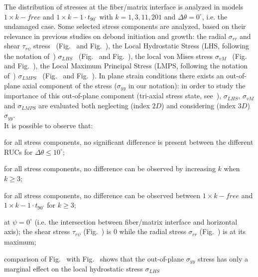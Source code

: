 \documentclass[12pt,a4paper]{article}
\begin{document}
The distribution of stresses at the fiber/matrix interface is analyzed in models $1\times k-free$ and $1\times k-1\cdot t_{90^{\circ}}$ with $k=1,3,11,201$ and $\Delta\theta=0^{\circ}$, i.e. the undamaged case. Some selected stress components are analyzed, based on their relevance in previous studies on debond initiation and growth: the radial $\sigma_{rr}$ and shear $\tau_{r\psi}$ stress~\cite{Mantic2009} (Fig.~\cite{fig:stress-a} and Fig.~\cite{fig:stress-b}), the Local Hydrostatic Stress (LHS, following the notation of~\cite{Carraro2016}) $\sigma_{LHS}$~\cite{Asp1996a,Asp1996b} (Fig.~\cite{fig:stress-c} and Fig.~\cite{fig:stress-d}), the local von Mises stress $\sigma_{vM}$~\cite{Canal2012}  (Fig.~\cite{fig:stress-e} and Fig.~\cite{fig:stress-f}), the Local Maximum Principal Stress (LMPS, following the notation of~\cite{Carraro2016}) $\sigma_{LMPS}$~\cite{Carraro2014}  (Fig.~\cite{fig:stress-g} and Fig.~\cite{fig:stress-h}). In plane strain conditions there exists an out-of-plane axial component of the stress ($\sigma_{yy}$ in our notation): in order to study the importance of this out-of-plane component (tri-axial stress state, see~\cite{Asp1995}), $\sigma_{LHS}$, $\sigma_{vM}$ and $\sigma_{LMPS}$ are evaluated both neglecting (index $2D$) and considering (index $3D$)  $\sigma_{yy}$.\\
It is possible to observe that:

\begin{itemize}[\label={--}]
\item for all stress components, no significant difference is present between the different RUCs for $\Delta\theta\leq10^{\circ}$;
\item for all stress components, no difference can be observed by increasing $k$ when $k\geq3$;
\item for all stress components, no difference can be observed between $1\times  k-free$ and $1\times  k-1\cdot t_{90^{\circ}}$ for $k\geq3$;
\item at $\psi=0^{\circ}$ (i.e. the intersection between fiber/matrix interface and horizontal axis); the shear stress $\tau_{r\psi}$ (Fig.~\cite{fig:stress-b}) is $0$ while the radial stress $\sigma_{rr}$ (Fig.~\cite{fig:stress-a}) is at its maximum;
\item comparison of Fig.~\cite{fig:stress-c} with Fig.~\cite{fig:stress-d} shows that the out-of-plane $\sigma_{yy}$ stress has only a marginal effect on the local hydrostatic stress $\sigma_{LHS}$
\end{itemize}
\end{document}
